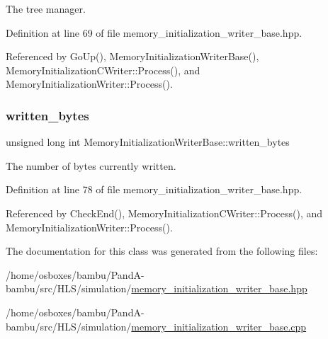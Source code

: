 The tree manager. 



Definition at line 69 of file memory\+\_\+initialization\+\_\+writer\+\_\+base.\+hpp.



Referenced by Go\+Up(), Memory\+Initialization\+Writer\+Base(), Memory\+Initialization\+C\+Writer\+::\+Process(), and Memory\+Initialization\+Writer\+::\+Process().

\mbox{\label{classMemoryInitializationWriterBase_ad9086045443d3ea69d54c5ec9d10fd0b}} 
\subsubsection{\texorpdfstring{written\+\_\+bytes}{written\_bytes}}
{\footnotesize\ttfamily unsigned long int Memory\+Initialization\+Writer\+Base\+::written\+\_\+bytes\hspace{0.3cm}{\ttfamily [protected]}}



The number of bytes currently written. 



Definition at line 78 of file memory\+\_\+initialization\+\_\+writer\+\_\+base.\+hpp.



Referenced by Check\+End(), Memory\+Initialization\+C\+Writer\+::\+Process(), and Memory\+Initialization\+Writer\+::\+Process().



The documentation for this class was generated from the following files\+:\begin{DoxyCompactItemize}
\item 
/home/osboxes/bambu/\+Pand\+A-\/bambu/src/\+H\+L\+S/simulation/\hyperlink{memory__initialization__writer__base_8hpp}{memory\+\_\+initialization\+\_\+writer\+\_\+base.\+hpp}\item 
/home/osboxes/bambu/\+Pand\+A-\/bambu/src/\+H\+L\+S/simulation/\hyperlink{memory__initialization__writer__base_8cpp}{memory\+\_\+initialization\+\_\+writer\+\_\+base.\+cpp}\end{DoxyCompactItemize}
